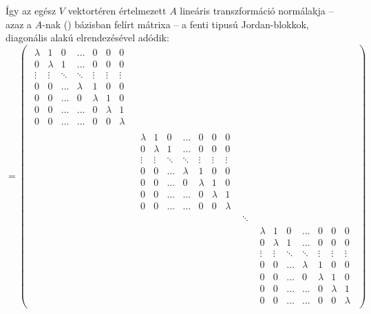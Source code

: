 \documentclass[9pt, a4paper, showtrims]{memoir}
\theoremstyle{plain}
\theoremstyle{remark}
\theoremstyle{definition}
\begin{document}
Így az egész $V$ vektortéren értelmezett $A$ lineáris transzformáció normálakja
--
azaz a $A$-nak (\dag) bázisban felírt mátrixa
--
a fenti tipusú Jordan-blokkok, diagonális alakú elrendezésével adódik:
\begin{displaymath}
	[A]=
	\begin{pmatrix}
		\begin{matrix}
			\lambda & 1       & 0      & \dots   & 0       & 0       & 0       \\
			0       & \lambda & 1      & \dots   & 0       & 0       & 0       \\
			\vdots  & \vdots  & \ddots & \ddots  & \vdots  & \vdots  & \vdots  \\
			0       & 0       & \dots  & \lambda & 1       & 0       & 0       \\
			0       & 0       & \dots  & 0       & \lambda & 1       & 0       \\
			0       & 0       & \dots  & \dots   & 0       & \lambda & 1       \\
			0       & 0       & \dots  & \dots   & 0       & 0       & \lambda
		\end{matrix} &        &        & \\
		                                & \!\!\!
		\begin{matrix}
			\lambda & 1       & 0      & \dots   & 0       & 0       & 0       \\
			0       & \lambda & 1      & \dots   & 0       & 0       & 0       \\
			\vdots  & \vdots  & \ddots & \ddots  & \vdots  & \vdots  & \vdots  \\
			0       & 0       & \dots  & \lambda & 1       & 0       & 0       \\
			0       & 0       & \dots  & 0       & \lambda & 1       & 0       \\
			0       & 0       & \dots  & \dots   & 0       & \lambda & 1       \\
			0       & 0       & \dots  & \dots   & 0       & 0       & \lambda
		\end{matrix}
		                                &        &          \\
		                                &        & \ddots & \\
		                                &        &        &
		\begin{matrix}
			\lambda & 1       & 0      & \dots   & 0       & 0       & 0       \\
			0       & \lambda & 1      & \dots   & 0       & 0       & 0       \\
			\vdots  & \vdots  & \ddots & \ddots  & \vdots  & \vdots  & \vdots  \\
			0       & 0       & \dots  & \lambda & 1       & 0       & 0       \\
			0       & 0       & \dots  & 0       & \lambda & 1       & 0       \\
			0       & 0       & \dots  & \dots   & 0       & \lambda & 1       \\
			0       & 0       & \dots  & \dots   & 0       & 0       & \lambda
		\end{matrix}
	\end{pmatrix}
\end{displaymath}
\end{document}
